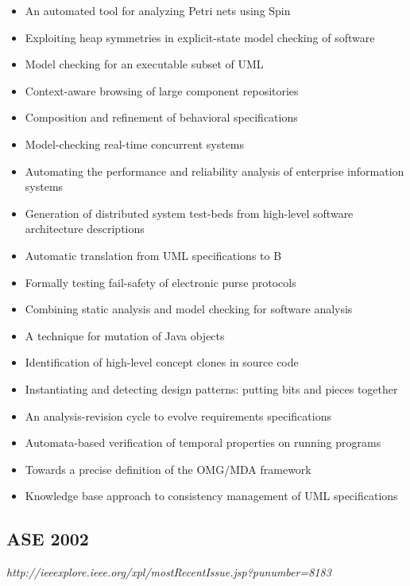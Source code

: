 {\begin{itemize}[itemsep=-1ex]
  \item An automated tool for analyzing Petri nets using Spin
  \item Exploiting heap symmetries in explicit-state model checking of software
  \item Model checking for an executable subset of UML
  \item Context-aware browsing of large component repositories
  \item Composition and refinement of behavioral specifications
  \item Model-checking real-time concurrent systems
  \item Automating the performance and reliability analysis of enterprise information systems
  \item Generation of distributed system test-beds from high-level software architecture descriptions
  \item Automatic translation from UML specifications to B
  \item Formally testing fail-safety of electronic purse protocols
  \item Combining static analysis and model checking for software analysis
  \item A technique for mutation of Java objects
  \item Identification of high-level concept clones in source code
  \item Instantiating and detecting design patterns: putting bits and pieces together
  \item An analysis-revision cycle to evolve requirements specifications
  \item Automata-based verification of temporal properties on running programs
  \item Towards a precise definition of the OMG/MDA framework
  \item Knowledge base approach to consistency management of UML specifications 
\end{itemize}
}

\subsection{ASE 2002}

{\small \em http://ieeexplore.ieee.org/xpl/mostRecentIssue.jsp?punumber=8183}

